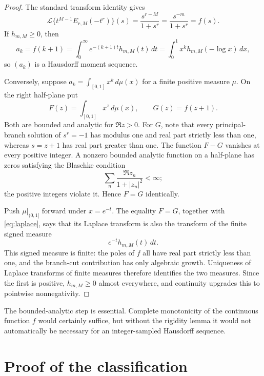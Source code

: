 \documentclass[11pt]{article}
\newcommand{\Lap}{\mathcal L}
\begin{document}
\begin{proof}
The standard transform identity gives
\begin{equation}\label{eq:laplace}
 \Lap\{t^{M-1}E_{r,M}(-t^r)\}(s)
 =\frac{s^{r-M}}{1+s^r}
 =\frac{s^{-m}}{1+s^r}=f(s).
\end{equation}
If $h_{m,M}\geq0$, then
\[
 a_k=f(k+1)=\int_0^\infty e^{-(k+1)t}h_{m,M}(t)\,dt
 =\int_0^1x^k h_{m,M}(-\log x)\,dx,
\]
so $(a_k)$ is a Hausdorff moment sequence.

Conversely, suppose $a_k=\int_{[0,1]}x^k\,d\mu(x)$ for a finite positive
measure $\mu$.  On the right half-plane put
\[
 F(z)=\int_{[0,1]}x^z\,d\mu(x),\qquad
 G(z)=f(z+1).
\]
Both are bounded and analytic for $\Re z>0$.  For $G$, note that every
principal-branch solution of $s^r=-1$ has modulus one and real part strictly
less than one, whereas $s=z+1$ has real part greater than one.  The function
$F-G$ vanishes at every positive integer.  A nonzero bounded analytic
function on a half-plane has zeros satisfying the Blaschke condition
\[
 \sum_n\frac{\Re z_n}{1+|z_n|^2}<\infty;
\]
the positive integers violate it.  Hence $F=G$ identically.

Push $\mu|_{(0,1]}$ forward under $x=e^{-t}$.  The equality $F=G$, together
with \eqref{eq:laplace}, says that its Laplace transform is also the transform
of the finite signed measure
\[
 e^{-t}h_{m,M}(t)\,dt.
\]
This signed measure is finite: the poles of $f$ all have real part strictly
less than one, and the branch-cut contribution has only algebraic growth.
Uniqueness of Laplace transforms of finite measures therefore identifies the
two measures.  Since the first is positive, $h_{m,M}\geq0$ almost everywhere,
and continuity upgrades this to pointwise nonnegativity.
\end{proof}

The bounded-analytic step is essential.  Complete monotonicity of the
continuous function $f$ would certainly suffice, but without the rigidity
lemma it would not automatically be necessary for an integer-sampled
Hausdorff sequence.

\section{Proof of the classification}
\end{document}

